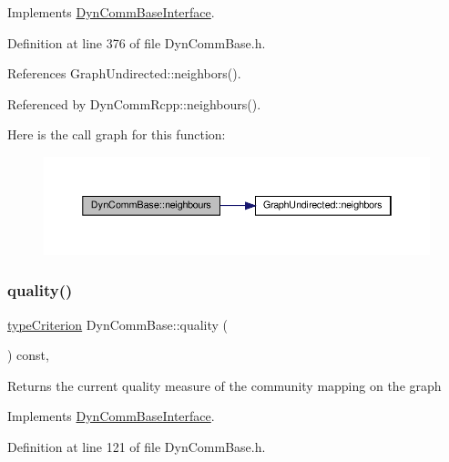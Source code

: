 Implements \hyperlink{classDynCommBaseInterface_a9d6f5345d8cdf9e0d70b7a71bff8ade6}{Dyn\+Comm\+Base\+Interface}.



Definition at line 376 of file Dyn\+Comm\+Base.\+h.



References Graph\+Undirected\+::neighbors().



Referenced by Dyn\+Comm\+Rcpp\+::neighbours().

Here is the call graph for this function\+:
\nopagebreak
\begin{figure}[H]
\begin{center}
\leavevmode
\includegraphics[width=350pt]{classDynCommBase_a3500faab82a0547422b2202b79f49718_cgraph}
\end{center}
\end{figure}
\mbox{\label{classDynCommBase_a316b2c63a025810211d205ef6bf1d06c}} 
\subsubsection{\texorpdfstring{quality()}{quality()}}
{\footnotesize\ttfamily \hyperlink{criterionInterface_8h_af71ff22f6355fd69a4a62104bfd59a83}{type\+Criterion} Dyn\+Comm\+Base\+::quality (\begin{DoxyParamCaption}{ }\end{DoxyParamCaption}) const\hspace{0.3cm}{\ttfamily [inline]}, {\ttfamily [virtual]}}

\begin{DoxyReturn}{Returns}
the current quality measure of the community mapping on the graph 
\end{DoxyReturn}


Implements \hyperlink{classDynCommBaseInterface_a42863260fe57e0982be227255d4f8464}{Dyn\+Comm\+Base\+Interface}.



Definition at line 121 of file Dyn\+Comm\+Base.\+h.



